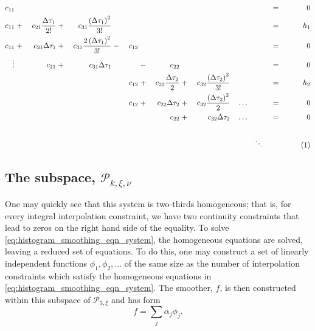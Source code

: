 \documentclass[12pt]{article}
\newcommand\numberthis{\addtocounter{equation}{1}\tag{\theequation}}
\newcommand{\PP}{\mathcal{P}}
\theoremstyle{definition}
\begin{document}
\begin{align*}
c_{11} &  &  &  &  &  &  & & & & & & & &&&&= & 0  \\
c_{11} & \;+\;  & c_{21} \frac{\Delta\tau_{1}}{2!} & \;+\;   & c_{31} \frac{\left(\Delta\tau_{1}\right)^2} {3!}  & 			   & 		 		        &  	      & & & && & &&&& = & h_1\\
c_{11} & \; +\; & c_{21}\Delta\tau_{1}                 & \; + \; & c_{31}\frac{2\left(\Delta\tau_{1}\right)^2}{3!}  & \;-\; & c_{12} &  		        & 	      & & & & & &&&& = & 0\\
\vdots   &  		   & c_{21}  				     & \; + \; & c_{31} \Delta\tau_{1}  				     &  		   &  		 & \;-\;  & c_{22} & && & & &&&& = & 0\\
	   &  			   &             				     &                        & 								     &  		   &   c_{12} &\;+\; &  c_{22}\frac{\Delta\tau_2}{2} &\;+\; & c_{32}\frac{\left(\Delta\tau_2\right)^2}{3!} & & & & &&& = & h_2\\
	   &  			   &             				     &                        & 								     &  		   &   c_{12} &\;+\; &  c_{22}\Delta\tau_2        &\;+\; & c_{32}\frac{\left(\Delta\tau_2\right)^2}{2} & & &\dots &&&&  = & 0\\
	   	   &  			   &             				     &                        & 								     &  		   &   		 &	&  c_{22}        &\;+\; & c_{32}\Delta\tau_2 & & & \dots &&&&  = & 0\\
    &  &  &  &  &  &  & & & & && & &&&&  &\\
   &  &  &  &  &  &  & & & & && & &\ddots &&&  & \numberthis  \label{eq:histogram_smoothing_eqn_system}
\end{align*}

\subsection{The subspace, $\PP_{k,\xi,\nu}$}
One may quickly see that this system is two-thirds homogeneous; that is, for every integral interpolation constraint, we have two continuity constraints that lead to zeros on the right hand side of the equality. To solve \ref{eq:histogram_smoothing_eqn_system}, the homogeneous equations are solved, leaving a reduced set of equations. To do this, one may construct a set of linearly independent functions $\phi_1, \phi_2, \dots$ of the same size as the number of interpolation constraints which satisfy the homogeneous equations in \ref{eq:histogram_smoothing_eqn_system}. The smoother, $f$, is then constructed within this subspace of $\PP_{3,\xi}$ and has form 
\[
f = \sum_{j} \alpha_j \phi_j.
\] 
\end{document}
